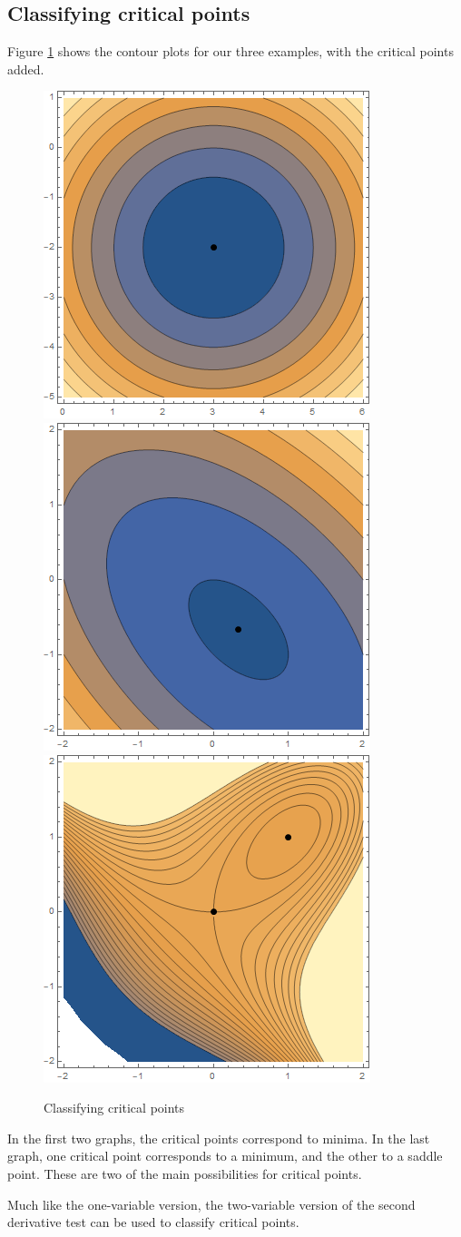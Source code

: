 \documentclass[
]{book}
\theoremstyle{definition}
\theoremstyle{definition}
\theoremstyle{definition}
\theoremstyle{definition}
\theoremstyle{remark}
\begin{document}
\subsection*{Classifying critical points}\label{classifying-critical-points}

Figure \ref{fig:classifying} shows the contour plots for our three examples, with the critical points added.

\begin{figure}

{\centering \includegraphics[width=0.3\linewidth]{images/opt1} \includegraphics[width=0.3\linewidth]{images/opt2} \includegraphics[width=0.3\linewidth]{images/opt3} 

}

\caption{Classifying critical points}\label{fig:classifying}
\end{figure}

In the first two graphs, the critical points correspond to minima. In the last graph, one critical point corresponds to a minimum, and the other to a saddle point. These are two of the main possibilities for critical points.

Much like the one-variable version, the two-variable version of the second derivative test can be used to classify critical points.
\end{document}
